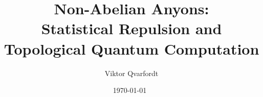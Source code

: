 




\title{Non-Abelian Anyons:\\Statistical Repulsion and\\Topological Quantum Computation}
\author{Viktor Qvarfordt}
\date{\isodate\today\ \currenttime}

\maketitle



\tableofcontents
\newpage










\appendix


\backmatter




